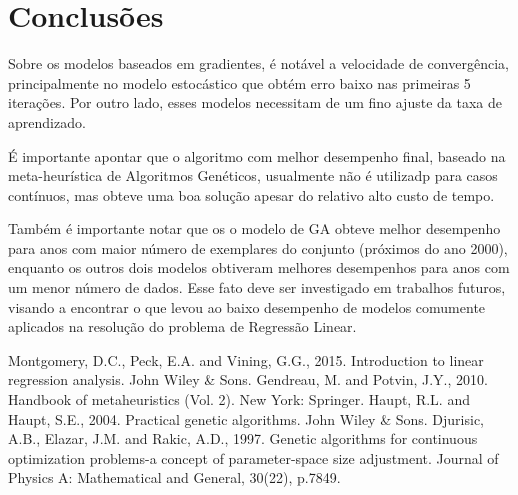\documentclass[conference]{IEEEtran}
\begin{document}
\section{Conclusões}
Sobre os modelos baseados em gradientes, é notável a velocidade de convergência, principalmente no modelo estocástico que obtém erro baixo nas primeiras 5 iterações. Por outro lado, esses modelos necessitam de um fino ajuste da taxa de aprendizado.

É importante apontar que o algoritmo com melhor desempenho final, baseado na meta-heurística de Algoritmos Genéticos, usualmente não é utilizadp para casos contínuos, mas obteve uma boa solução apesar do relativo alto custo de tempo. 

Também é importante notar que os o modelo de GA obteve melhor desempenho para anos com maior número de exemplares do conjunto (próximos do ano 2000), enquanto os outros dois modelos obtiveram melhores desempenhos para anos com um menor número de dados. Esse fato deve ser investigado em trabalhos futuros, visando a encontrar o que levou ao baixo desempenho de modelos comumente aplicados na resolução do problema de Regressão Linear.  


\begin{thebibliography}{00}
 Montgomery, D.C., Peck, E.A. and Vining, G.G., 2015. Introduction to linear regression analysis. John Wiley \& Sons.
 Gendreau, M. and Potvin, J.Y., 2010. Handbook of metaheuristics (Vol. 2). New York: Springer.
 Haupt, R.L. and Haupt, S.E., 2004. Practical genetic algorithms. John Wiley \& Sons.
 Djurisic, A.B., Elazar, J.M. and Rakic, A.D., 1997. Genetic algorithms for continuous optimization problems-a concept of parameter-space size adjustment. Journal of Physics A: Mathematical and General, 30(22), p.7849.
\end{thebibliography}
\end{document}
